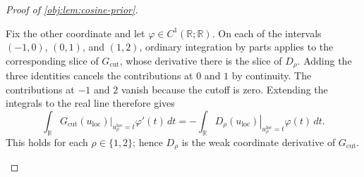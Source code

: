 \documentclass[11pt]{article}
\begin{document}
\begin{proof}[Proof of \cref{obj:lem:cosine-prior}]
\begin{enumerate}
Fix the other coordinate and let \(\varphi\in C^1(\mathbb R;\mathbb R)\).
On each of the intervals \((-1,0)\), \((0,1)\), and \((1,2)\), ordinary
integration by parts applies to the corresponding slice of
\(G_{\mathrm{cut}}\), whose derivative there is the slice of \(D_\rho\).
Adding the three identities cancels the contributions at \(0\) and \(1\)
by continuity. The contributions at \(-1\) and \(2\) vanish because the
cutoff is zero. Extending the integrals to the real line therefore gives
\[
\int_{\mathbb R}
 \left.G_{\mathrm{cut}}(u_{\mathrm{loc}})
 \right|_{u_\rho^{\mathrm{loc}}=t}
 \varphi'(t)\,dt
=
-\int_{\mathbb R}
 \left.D_\rho(u_{\mathrm{loc}})
 \right|_{u_\rho^{\mathrm{loc}}=t}
 \varphi(t)\,dt.
\]
This holds for each \(\rho\in\{1,2\}\); hence \(D_\rho\) is the weak
coordinate derivative of \(G_{\mathrm{cut}}\).


\end{enumerate}
\end{proof}
\end{document}
